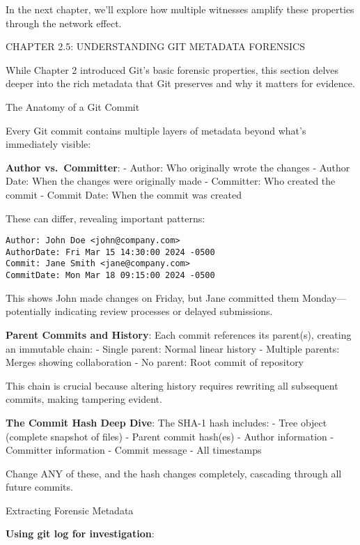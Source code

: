 In the next chapter, we'll explore how multiple witnesses amplify these
properties through the network effect.

CHAPTER 2.5: UNDERSTANDING GIT METADATA FORENSICS

While Chapter 2 introduced Git's basic forensic properties, this section
delves deeper into the rich metadata that Git preserves and why it
matters for evidence.

The Anatomy of a Git Commit

Every Git commit contains multiple layers of metadata beyond what's
immediately visible:

\textbf{Author vs.~Committer}: - Author: Who originally wrote the
changes - Author Date: When the changes were originally made -
Committer: Who created the commit - Commit Date: When the commit was
created

These can differ, revealing important patterns:

\begin{verbatim}
Author: John Doe <john@company.com>
AuthorDate: Fri Mar 15 14:30:00 2024 -0500
Commit: Jane Smith <jane@company.com>
CommitDate: Mon Mar 18 09:15:00 2024 -0500
\end{verbatim}

This shows John made changes on Friday, but Jane committed them
Monday---potentially indicating review processes or delayed submissions.

\textbf{Parent Commits and History}: Each commit references its
parent(s), creating an immutable chain: - Single parent: Normal linear
history - Multiple parents: Merges showing collaboration - No parent:
Root commit of repository

This chain is crucial because altering history requires rewriting all
subsequent commits, making tampering evident.

\textbf{The Commit Hash Deep Dive}: The SHA-1 hash includes: - Tree
object (complete snapshot of files) - Parent commit hash(es) - Author
information - Committer information - Commit message - All timestamps

Change ANY of these, and the hash changes completely, cascading through
all future commits.

Extracting Forensic Metadata

\textbf{Using git log for investigation}:

